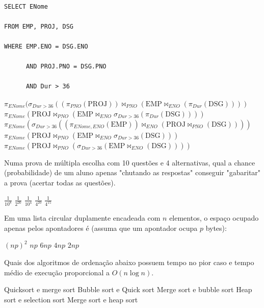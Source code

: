 \documentclass[12pt, addpoints]{exam}
\begin{document}
\begin{questions}
\begin{verbatim}

SELECT ENome

FROM EMP, PROJ, DSG

WHERE EMP.ENO = DSG.ENO

      AND PROJ.PNO = DSG.PNO

      AND Dur > 36

\end{verbatim}
\begin{choices}
\choice \( \pi_{ENome} (\sigma_{Dur > 36} ((\pi_{PNO} (\text{PROJ})) \Join_{PNO} (\text{EMP} \Join_{ENO} (\pi_{Dur} (\text{DSG})))) \)
\choice \( \pi_{ENome} (\text{PROJ} \Join_{PNO} (\text{EMP} \Join_{ENO} \sigma_{Dur > 36} (\pi_{Dur} (\text{DSG})))) \)
\choice \( \pi_{ENome} (\sigma_{Dur > 36} ((\pi_{ENome, ENO} (\text{EMP})) \Join_{ENO} (\text{PROJ} \Join_{PNO} (\text{DSG})))) \)
\choice \( \pi_{ENome} (\text{PROJ} \Join_{PNO} (\text{EMP} \Join_{ENO} \sigma_{Dur > 36} (\text{DSG}))) \)
\choice \( \pi_{ENome} (\text{PROJ} \Join_{PNO} (\sigma_{Dur > 36} (\text{EMP} \Join_{ENO} (\text{DSG})))) \)
\end{choices}

\question

Numa prova de múltipla escolha com 10 questões e 4 alternativas, qual a chance (probabilidade) de um aluno apenas "chutando as respostas" conseguir "gabaritar" a prova (acertar todas as questões).


\begin{choices}
\choice \( \frac{1}{10^{8}} \)
\choice \( \frac{1}{2^{20}} \)
\choice \( \frac{1}{10^{4}} \)
\choice \( \frac{1}{4^{20}} \)
\choice \( \frac{1}{4^{15}} \)
\end{choices}

\question

Em uma lista circular duplamente encadeada com \( n \) elementos, o espaço ocupado apenas pelos apontadores é (assuma que um apontador ocupa \( p \) bytes):
\begin{choices}
\choice \( (np)^2 \)
\choice \( np \)
\choice \( 6np \)
\choice \( 4np \)
\choice \( 2np \)
\end{choices}

\question

Quais dos algoritmos de ordenação abaixo possuem tempo no pior caso e tempo médio de execução proporcional a \( O(n \log n) \).
\begin{choices}
\choice Quicksort e merge sort
\choice Bubble sort e Quick sort
\choice Merge sort e bubble sort
\choice Heap sort e selection sort
\choice Merge sort e heap sort
\end{choices}


\end{questions}
\end{document}
